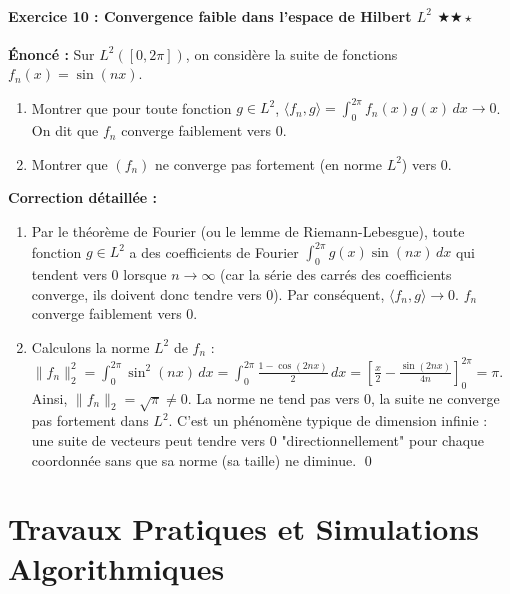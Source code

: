\documentclass[11pt,a4paper]{article}
\begin{document}
\subsection*{Exercice 10 : Convergence faible dans l'espace de Hilbert $L^2$ \quad $\bigstar\bigstar\star$}
\textbf{Énoncé :}
Sur $L^2([0,2\pi])$, on considère la suite de fonctions $f_n(x) = \sin(nx)$.
\begin{enumerate}
\item Montrer que pour toute fonction $g \in L^2$, $\langle f_n, g \rangle = \int_0^{2\pi} f_n(x)g(x) \, dx \to 0$. On dit que $f_n$ converge faiblement vers $0$.
\item Montrer que $(f_n)$ ne converge pas fortement (en norme $L^2$) vers $0$.
\end{enumerate}

\textbf{Correction détaillée :}
\begin{enumerate}
\item Par le théorème de Fourier (ou le lemme de Riemann-Lebesgue), toute fonction $g \in L^2$ a des coefficients de Fourier $\int_0^{2\pi} g(x)\sin(nx)\,dx$ qui tendent vers 0 lorsque $n \to \infty$ (car la série des carrés des coefficients converge, ils doivent donc tendre vers 0). Par conséquent, $\langle f_n, g \rangle \to 0$. $f_n$ converge faiblement vers $0$.
\item Calculons la norme $L^2$ de $f_n$ :
   $\|f_n\|_2^2 = \int_0^{2\pi} \sin^2(nx) \, dx = \int_0^{2\pi} \frac{1 - \cos(2nx)}{2} \, dx = \left[ \frac{x}{2} - \frac{\sin(2nx)}{4n} \right]_0^{2\pi} = \pi$.
   Ainsi, $\|f_n\|_2 = \sqrt{\pi} \neq 0$. La norme ne tend pas vers 0, la suite ne converge pas fortement dans $L^2$.
C'est un phénomène typique de dimension infinie : une suite de vecteurs peut tendre vers 0 "directionnellement" pour chaque coordonnée sans que sa norme (sa taille) ne diminue. \qed
\end{enumerate}




\part{Travaux Pratiques et Simulations Algorithmiques}
\end{document}

